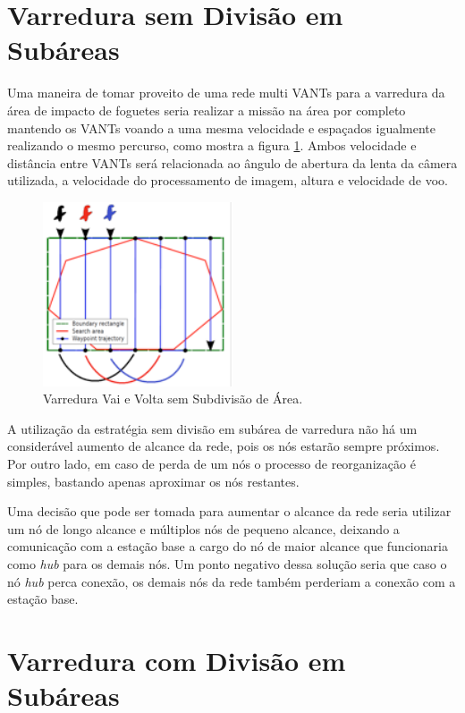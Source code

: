 \section{Varredura sem Divisão em Subáreas}

Uma maneira de tomar proveito de uma rede multi VANTs para a varredura da área de impacto de foguetes seria realizar a missão na área por completo mantendo os VANTs voando a uma mesma velocidade e espaçados igualmente realizando o mesmo percurso, como mostra a figura \ref{fig:semsubdivisao}. Ambos velocidade e distância entre VANTs será relacionada ao ângulo de abertura da lenta da câmera utilizada, a velocidade do processamento de imagem, altura e velocidade de voo.

\begin{figure} 
\center
\includegraphics[width=0.5\textwidth]{semsubdivisao.png}
\caption{Varredura Vai e Volta sem Subdivisão de Área.} 
\label{fig:semsubdivisao}
\end{figure}

A utilização da estratégia sem divisão em subárea de varredura não há um considerável aumento de alcance da rede, pois os nós estarão sempre próximos. Por outro lado, em caso de perda de um nós o processo de reorganização é simples, bastando apenas aproximar os nós restantes. 

Uma decisão que pode ser tomada para aumentar o alcance da rede seria utilizar um nó de longo alcance e múltiplos nós de pequeno alcance, deixando a comunicação com a estação base a cargo do nó de maior alcance que funcionaria como \emph{hub} para os demais nós. Um ponto negativo dessa solução seria que caso o nó \emph{hub} perca conexão, os demais nós da rede também perderiam a conexão com a estação base. 

\section{Varredura com Divisão em Subáreas}

